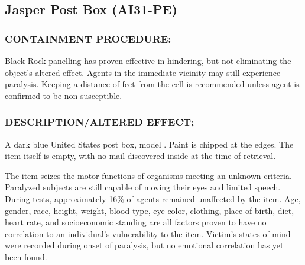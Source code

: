 \subsection*{Jasper Post Box (AI31-PE)}
\subsubsection*{CONTAINMENT PROCEDURE:}
\par Black Rock panelling has proven
effective in hindering, but not eliminating
the object's altered effect. Agents in the
immediate vicinity may still experience
paralysis. Keeping a distance of 
feet from the cell is
recommended unless agent is confirmed
to be non-susceptible.
\subsubsection*{DESCRIPTION/ALTERED EFFECT;}
\par A dark blue United States post box, model .
Paint is
chipped at the edges. The item itself is empty, with no mail
discovered inside at the time of retrieval.
\par The item seizes the motor functions of organisms meeting an
unknown criteria. Paralyzed subjects are still capable of moving
their eyes and limited speech. During tests, approximately 16\% of
agents remained unaffected by the item. Age, gender, race,
height, weight, blood type, eye color, clothing, place of birth, diet,
heart rate, and socioeconomic standing are all factors proven to
have no correlation to an individual's vulnerability to the item.
Victim's states of mind were recorded during onset of paralysis,
but no emotional correlation has yet been found.